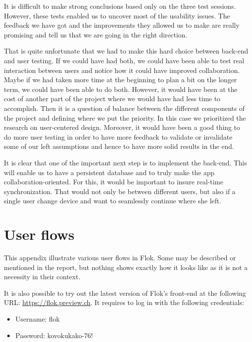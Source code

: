 \documentclass[a4paper,12pt,twoside]{article}
\begin{document}
It is difficult to make strong conclusions based only on the three test sessions.
However, these tests enabled us to uncover most of the usability issues.
The feedback we have got and the improvements they allowed us to make are really promising and tell us that we are going in the right direction.

That is quite unfortunate that we had to make this hard choice between back-end and user testing.
If we could have had both, we could have been able to test real interaction between users and notice how it could have improved collaboration.
Maybe if we had taken more time at the beginning to plan a bit on the longer term, we could have been able to do both.
However, it would have been at the cost of another part of the project where we would have had less time to accomplish.
Then it is a question of balance between the different components of the project and defining where we put the priority.
In this case we prioritized the research on user-centered design.
Moreover, it would have been a good thing to do more user testing in order to have more feedback to validate or invalidate some of our left assumptions and hence to have more solid results in the end.

It is clear that one of the important next step is to implement the back-end.
This will enable us to have a persistent database and to truly make the app collaboration-oriented.
For this, it would be important to insure real-time synchronization.
That would not only be between different users, but also if a single user change device and want to seamlessly continue where she left.

\cleardoublepage



\cleardoublepage
\appendix
\section{User flows}
This appendix illustrate various user flows in Flok.
Some may be described or mentioned in the report, but nothing shows exactly how it looks like as it is not a necessity in their context.

It is also possible to try out the latest version of Flok's front-end at the following URL: \url{https://flok.preview.ch}. It requires to log in with the following credentials:
\begin{itemize}
    \item Username: flok
    \item Password: kovokukako-76!
\end{itemize}
\end{document}
